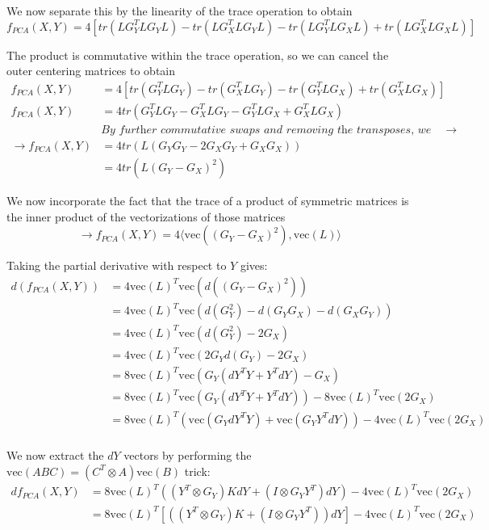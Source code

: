 \documentclass{article}
\theoremstyle{definition}
\begin{document}
We now separate this by the linearity of the trace operation to obtain
\[ f_{PCA}(X, Y) = 4 \left[ tr \left( L G_Y^T L G_Y L \right) - tr \left( L G_X^T L G_Y L \right) - tr \left( L G_Y^T L G_X L \right) + tr \left( L G_X^T L G_X L \right) \right] \]

The product is commutative within the trace operation, so we can cancel the outer centering matrices to obtain
\begin{align*}
f_{PCA}(X, Y) &= 4 \left[ tr \left( G_Y^T L G_Y \right) - tr \left( G_X^T L G_Y \right) - tr \left( G_Y^T L G_X \right) + tr \left( G_X^T L G_X \right) \right]
\\
f_{PCA}(X, Y) &= 4 tr \left( G_Y^T L G_Y - G_X^T L G_Y - G_Y^T L G_X + G_X^T L G_X \right) \\
&\textit{By further commutative swaps and removing the transposes, we get} \rightarrow \\
\rightarrow f_{PCA}(X, Y) &= 4 tr \left( L \left( G_Y G_Y - 2 G_X G_Y + G_X G_X \right) \right) \\
&= 4 tr \left( L \left( G_Y - G_X \right)^2 \right)
\end{align*}

We now incorporate the fact that the trace of a product of symmetric matrices is the inner product of the vectorizations of those matrices
\[ \rightarrow f_{PCA}(X, Y) = 4 \langle \text{vec}( (G_Y - G_X)^2 ), \text{vec}( L ) \rangle \]

Taking the partial derivative with respect to $Y$ gives:
\begin{align*}
    d(f_{PCA}(X, Y)) &= 4\text{vec}(L)^T \text{vec}\left( d \left( (G_Y - G_X)^2 \right) \right) \\
    &= 4\text{vec}(L)^T \text{vec}\left( d \left( G_Y^2 \right) - d \left( G_Y G_X \right) - d \left( G_X G_Y \right) \right) \\
    &= 4\text{vec}(L)^T \text{vec}\left( d \left( G_Y^2 \right) - 2G_X \right) \\
    &= 4\text{vec}(L)^T \text{vec}\left( 2 G_Y d \left( G_Y \right) - 2G_X \right) \\
    &= 8\text{vec}(L)^T \text{vec}\left( G_Y (dY^T Y + Y^T dY) - G_X \right) \\
    &= 8\text{vec}(L)^T \text{vec}\left( G_Y (dY^T Y + Y^T dY)\right) - 8\text{vec}(L)^T \text{vec} \left( 2G_X \right) \\
    &= 8\text{vec}(L)^T \left( \text{vec} \left( G_Y dY^T Y \right) + \text{vec} \left( G_Y Y^T dY \right)\right) - 4\text{vec}(L)^T \text{vec} \left( 2G_X \right) \\
\end{align*}

We now extract the $dY$ vectors by performing the $\text{vec}(ABC) = (C^T \otimes A) \text{vec}(B)$ trick:
\begin{align*}
    df_{PCA}(X, Y) &= 8\text{vec}(L)^T \left( (Y^T \otimes G_Y)K dY + (I \otimes G_Y Y^T) dY \right) - 4\text{vec}(L)^T \text{vec} \left( 2G_X \right) \\
    &= 8\text{vec}(L)^T \left[ \left( (Y^T \otimes G_Y)K + (I \otimes G_Y Y^T) \right) dY \right] - 4\text{vec}(L)^T \text{vec} \left( 2G_X \right) \\
\end{align*}
\end{document}
